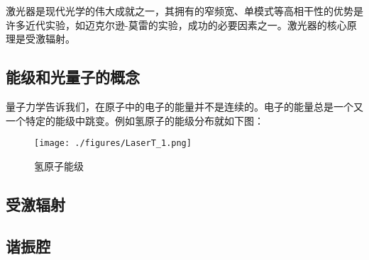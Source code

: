 
激光器是现代光学的伟大成就之一，其拥有的窄频宽、单模式等高相干性的优势是许多近代实验，如迈克尔逊-莫雷的实验，成功的必要因素之一。激光器的核心原理是受激辐射。

\subsection{能级和光量子的概念}
量子力学告诉我们，在原子中的电子的能量并不是连续的。电子的能量总是一个又一个特定的能级中跳变。例如氢原子的能级分布就如下图：\begin{figure}[ht]
\centering
\texttt{[image: ./figures/LaserT\_1.png]}
\caption{氢原子能级} \label{LaserT_fig1}
\end{figure}
\subsection{受激辐射}
\subsection{谐振腔}
